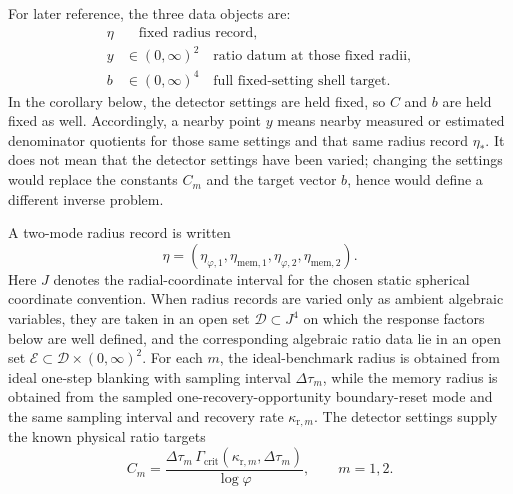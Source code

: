 For later reference, the three data objects are:
\[
\begin{aligned}
\eta &\quad \text{fixed radius record},\\
y &\in (0,\infty)^2 \quad \text{ratio datum at those fixed radii},\\
b &\in (0,\infty)^4 \quad \text{full fixed-setting shell target}.
\end{aligned}
\]
In the corollary below, the detector settings are held fixed, so $C$ and $b$ are
held fixed as well. Accordingly, a nearby point $y$ means nearby measured or
estimated denominator quotients for those same settings and that same radius
record $\eta_*$. It does not mean that the detector settings have been varied;
changing the settings would replace the constants $C_m$ and the target vector
$b$, hence would define a different inverse problem.

A two-mode radius record is written
\[
\eta=(\eta_{\varphi,1},\eta_{{\mathrm{mem}},1},
      \eta_{\varphi,2},\eta_{{\mathrm{mem}},2}).
\]
Here $J$ denotes the radial-coordinate interval for the chosen static spherical
coordinate convention. When radius records are varied only as ambient algebraic
variables, they are taken in an open set $\mathcal D\subset J^4$ on which the
response factors below are well defined, and the corresponding algebraic ratio
data lie in an open set $\mathcal E\subset\mathcal D\times(0,\infty)^2$.
For each $m$, the ideal-benchmark radius is obtained from ideal one-step
blanking with sampling interval $\Delta\tau_m$, while the memory radius is
obtained from the sampled one-recovery-opportunity boundary-reset mode and the
same sampling interval and recovery rate $\kappa_{{\mathrm r},m}$. The detector
settings supply the known physical ratio targets
\begin{equation}\label{eq:two-mode-ratio-constants-main}
C_m=\frac{\Delta\tau_m\,\Gamma_{\mathrm{crit}}(\kappa_{{\mathrm r},m},\Delta\tau_m)}{\log\varphi},
\qquad m=1,2.
\end{equation}

